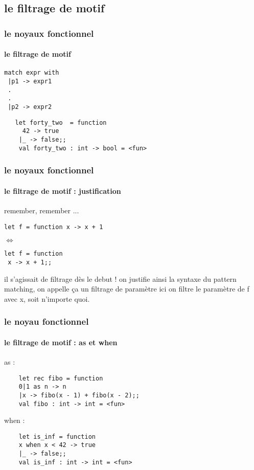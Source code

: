       \subsection{le filtrage de motif}
\begin{frame}[fragile]
  \frametitle{le noyaux fonctionnel}
  \framesubtitle{le filtrage de motif}
  \begin{minipage}[t]{5cm}
    \begin{lstlisting}
match expr with
 |p1 -> expr1
 .
 .
 |p2 -> expr2
 \end{lstlisting}
 \end{minipage}
 \begin{minipage}[t]{8cm}
   \begin{lstlisting}
   let forty_two  = function
     42 -> true
    |_ -> false;;
    val forty_two : int -> bool = <fun>
   \end{lstlisting} 
 \end{minipage}
\end{frame}
\begin{frame}[fragile]
  \frametitle{le noyaux fonctionnel}
  \framesubtitle{le filtrage de motif : justification}
remember, remember ...
\begin{lstlisting}
let f = function x -> x + 1 
\end{lstlisting}
\begin{center}
\begin{rotate}{90}
$\Leftrightarrow$
\end{rotate}
\end{center}
\begin{lstlisting}
let f = function 
 x -> x + 1;;
 \end{lstlisting}
  il s'agissait de filtrage dès le debut ! on justifie ainsi la syntaxe du pattern matching, 
  on appelle ça un filtrage de paramètre ici on filtre le paramètre de f avec x, soit n'importe quoi.
\end{frame}
\begin{frame}[fragile]
  \frametitle{le noyau fonctionnel}
  \framesubtitle{le filtrage de motif : as et when}
  \begin{itemize}
  \begin{minipage}[t]{5cm}
  \item
    as :
    \begin{lstlisting}
	let rec fibo = function 
 	0|1 as n -> n 
 	|x -> fibo(x - 1) + fibo(x - 2);; 
	val fibo : int -> int = <fun>
    \end{lstlisting}
  \end{minipage}
  \begin{minipage}[t]{5cm}
  \item
    when :
    \begin{lstlisting}
	let is_inf = function 
  	x when x < 42 -> true
 	|_ -> false;;
	val is_inf : int -> int = <fun>
    \end{lstlisting}
  \end{minipage}
  \end{itemize}
\end{frame}
